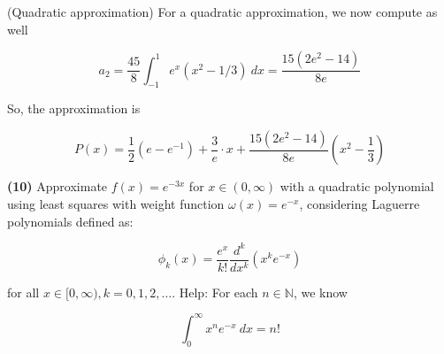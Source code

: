 \documentclass[12pt]{article}
\theoremstyle{definition}
\begin{document}
(Quadratic approximation) For a quadratic approximation, we now compute as well 

\begin{equation*}
    a_2 = \frac{45}{8} \int_{-1}^1 e^x(x^2 - 1 / 3) ~ dx = \frac{15(2e^2 - 14)}{8e}
\end{equation*}

So, the approximation is


\begin{equation*}
P(x) = \frac{1}{2}(e - e^{-1}) + \frac{3}{e} \cdot x + \frac{15(2e^2 -
14)}{8e}\left( x^2 - \frac{1}{3} \right) 
\end{equation*}


\begin{center}
\end{center}



\pagebreak 

\begin{shaded}
    \textbf{(10)} Approximate $f(x) = e^{-3x}$ for $x \in (0, \infty)$
    with a quadratic polynomial using least squares with weight function 
    $\omega(x) = e^{-x}$, considering Laguerre polynomials defined as: 

    \begin{equation*}
        \phi_k(x) = \frac{e^x}{k!} \frac{d^k}{dx^k}(x^k e^{-x})
    \end{equation*}

    for all $x \in [0, \infty), k = 0, 1, 2, \ldots$. Help: For each $n \in
    \mathbb{N}$, we know 

    \begin{equation*}
        \int_0^\infty x^n e^{-x} ~ dx = n!
    \end{equation*}
\end{shaded}
\end{document}
